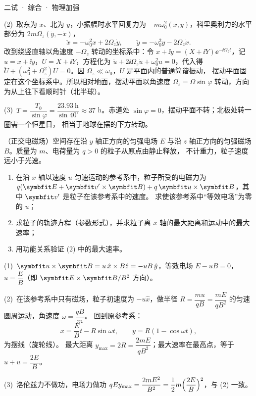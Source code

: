 \documentclass[cjk=noto, seal=first]{mojing-exam}
\begin{document}
\begin{paper}[time={建议 1.5 小时（训练设置）}, full=100]{二试 · 综合 · 物理加强}
\begin{questions}
\begin{solution}
(2)~取东为 $x$、北为 $y$，小振幅时水平回复力为 $-m\omega_0^2(x,y)$，科里奥利力的水平部分为 $2m\Omega_z(\dot y,-\dot x)$，
\[
  \ddot x=-\omega_0^2x+2\Omega_z\dot y,\qquad \ddot y=-\omega_0^2y-2\Omega_z\dot x .
\]
改到绕竖直轴以角速度 $-\Omega_z$ 转动的坐标系中：令 $x+\ii y=(X+\ii Y)\ee^{-\ii\Omega_zt}$，记 $u=x+\ii y$，$U=X+\ii Y$，方程化为
$\ddot u+2\ii\Omega_z\dot u+\omega_0^2u=0$，代入得 $\ddot U+(\omega_0^2+\Omega_z^2)U=0$。因 $\Omega_z\ll\omega_0$，$U$ 是平面内的普通简谐振动，
摆动平面固定在这个坐标系中。所以相对地面，摆动平面以角速度 $\Omega_z=\Omega\sin\varphi$ 转动，方向为从上往下看顺时针（北半球）。

(3)~$T=\dfrac{T_0}{\sin\varphi}=\dfrac{23.93\ \mathrm h}{\sin40^\circ}\approx37$ h。赤道处 $\sin\varphi=0$，摆动平面不转；北极处转一圈需一个恒星日，
相当于地球在摆的下方转动。
\end{solution}

\question[25]
（正交电磁场）空间存在沿 $y$ 轴正方向的匀强电场 $E$ 与沿 $z$ 轴正方向的匀强磁场 $B$。质量为 $m$、电荷量为 $q>0$ 的粒子从原点由静止释放，
不计重力，粒子速度远小于光速。
\begin{enumerate}
  \item 在沿 $x$ 轴以速度 $u$ 匀速运动的参考系中，粒子所受的电磁力为 $q(\vb E+\vb v'\times\vb B)+q\,\vb u\times\vb B$，其中 $\vb v'$ 是粒子在该参考系中的速度。
        求使该参考系中“等效电场”为零的 $u$；
  \item 求粒子的轨迹方程（参数形式），并求粒子离 $x$ 轴的最大距离和运动中的最大速率；
  \item 用功能关系验证 (2) 中的最大速率。
\end{enumerate}
\answerspace{2cm}
\begin{solution}
(1)~$\vb u\times\vb B=u\,\hat x\times B\hat z=-uB\,\hat y$，等效电场 $E-uB=0$，$u=\dfrac EB$（即 $\vb E\times\vb B/B^2$ 方向）。

(2)~在该参考系中只有磁场，粒子初速度为 $-u\hat x$，做半径 $R=\dfrac{mu}{qB}=\dfrac{mE}{qB^2}$ 的匀速圆周运动，角速度 $\omega=\dfrac{qB}{m}$。
回到原参考系：
\[
  x=\frac{E}{B}t-R\sin\omega t,\qquad y=R(1-\cos\omega t),
\]
为摆线（旋轮线）。
最大距离 $y_{\max}=2R=\dfrac{2mE}{qB^2}$；最大速率在最高点，等于 $u+u=\dfrac{2E}{B}$。

(3)~洛伦兹力不做功，电场力做功 $qEy_{\max}=\dfrac{2mE^2}{B^2}=\dfrac12m\Bigl(\dfrac{2E}B\Bigr)^2$，与 (2) 一致。
\end{solution}


\end{questions}
\end{paper}
\end{document}
